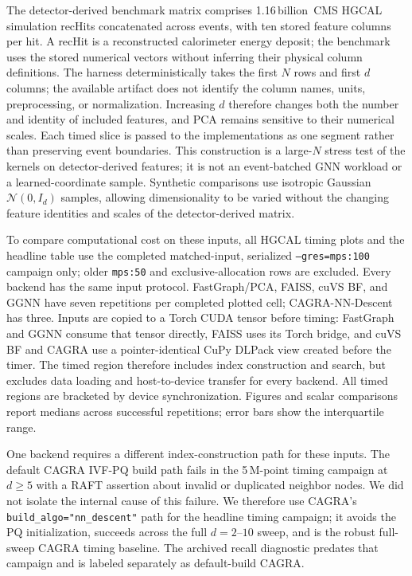\documentclass[final,3p,11pt]{elsarticle}
\newcommand{\hgcalRecHits}{1.16\,billion}
\begin{document}
The detector-derived benchmark matrix comprises \hgcalRecHits\ CMS HGCAL
simulation recHits concatenated across events, with ten stored feature
columns per hit. A recHit is a reconstructed calorimeter energy deposit;
the benchmark uses the stored numerical vectors without inferring their
physical column definitions. The harness deterministically takes the first
$N$ rows and first $d$ columns; the available artifact does not identify
the column names, units, preprocessing, or normalization. Increasing $d$
therefore changes both the number and identity of included features,
and PCA remains sensitive to their numerical scales. Each timed slice
is passed to the implementations as one segment rather than preserving
event boundaries. This construction is a large-$N$ stress test of the
kernels on detector-derived features; it is not an event-batched GNN
workload or a learned-coordinate sample. Synthetic comparisons use
isotropic Gaussian $\mathcal{N}(0,I_d)$ samples, allowing dimensionality
to be varied without the changing feature identities and scales of
the detector-derived matrix.

To compare computational cost on these inputs, all HGCAL timing plots
and the headline table use the completed
matched-input, serialized \texttt{--gres=mps:100} campaign only; older
\texttt{mps:50} and exclusive-allocation rows are excluded. Every backend
has the same input protocol. FastGraph/PCA, FAISS, cuVS BF, and GGNN
have seven repetitions per completed plotted cell; CAGRA-NN-Descent has
three. Inputs are copied to a
Torch CUDA tensor before timing: FastGraph and GGNN consume that tensor
directly, FAISS uses its Torch bridge, and cuVS BF and CAGRA use a
pointer-identical CuPy DLPack view created before the timer. The timed
region therefore includes index construction and search, but excludes data
loading and host-to-device transfer for every backend. All timed regions are
bracketed by device synchronization. Figures and scalar comparisons report
medians across successful repetitions; error bars show the interquartile
range.

One backend requires a different index-construction path for these inputs.
The default CAGRA IVF-PQ build path fails in the 5\,M-point timing campaign at $d \ge 5$
with a RAFT assertion about invalid or duplicated neighbor nodes. We did
not isolate the internal cause of this failure. We therefore use CAGRA's
\texttt{build\_algo="nn\_descent"}
path for the headline timing campaign; it avoids the PQ initialization,
succeeds across the full $d{=}2$--$10$ sweep, and is the robust full-sweep
CAGRA timing baseline. The archived recall diagnostic predates that campaign
and is labeled separately as default-build CAGRA.
\end{document}
